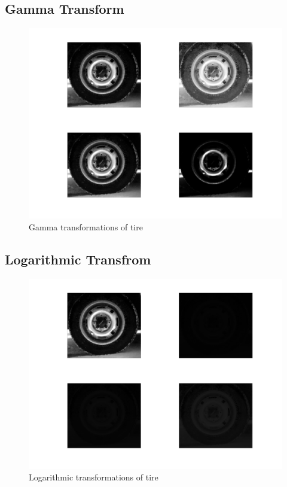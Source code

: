 \subsection{Gamma Transform}

\begin{figure}[H]
    \centering
    \includegraphics[scale=0.8]{tire_gamma}
    \caption{Gamma transformations of tire}
\end{figure}

\subsection{Logarithmic Transfrom}

\begin{figure}[H]
    \centering
    \includegraphics[scale=0.8]{tire_log}
    \caption{Logarithmic transformations of tire}
\end{figure}

